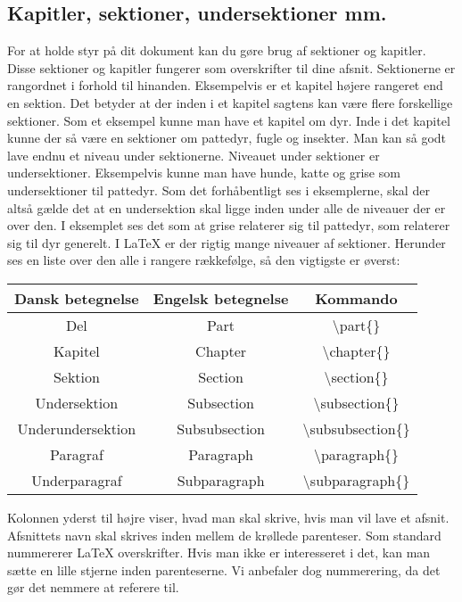\subsection{Kapitler, sektioner, undersektioner mm.}
For at holde styr på dit dokument kan du gøre brug af sektioner og kapitler.
Disse sektioner og kapitler fungerer som overskrifter til dine afsnit.
Sektionerne er rangordnet i forhold til hinanden.
Eksempelvis er et kapitel højere rangeret end en sektion.
Det betyder at der inden i et kapitel sagtens kan være flere forskellige sektioner.
Som et eksempel kunne man have et kapitel om dyr.
Inde i det kapitel kunne der så være en sektioner om pattedyr, fugle og insekter.
Man kan så godt lave endnu et niveau under sektionerne.
Niveauet under sektioner er undersektioner.
Eksempelvis kunne man have hunde, katte og grise som undersektioner til pattedyr.
Som det forhåbentligt ses i eksemplerne, skal der altså gælde det at en undersektion skal ligge inden under alle de niveauer der er over den.
I eksemplet ses det som at grise relaterer sig til pattedyr, som relaterer sig til dyr generelt.
I \LaTeX{} er der rigtig mange niveauer af sektioner.
Herunder ses en liste over den alle i rangere rækkefølge, så den vigtigste er øverst:
\bigbreak


\begin{center}
\begin{tabular}{|c|c|c|}
	\hline \textbf{Dansk betegnelse} & \textbf{Engelsk betegnelse} & \textbf{Kommando}\\ \hline
	Del & Part & \textbackslash part\{\} \\ \hline
	Kapitel & Chapter & \textbackslash chapter\{\} \\ \hline
	Sektion & Section & \textbackslash section\{\} \\ \hline
	Undersektion & Subsection & \textbackslash subsection\{\} \\ \hline
	Underundersektion & Subsubsection & \textbackslash subsubsection\{\} \\ \hline
	Paragraf & Paragraph & \textbackslash paragraph\{\} \\ \hline
	Underparagraf & Subparagraph & \textbackslash subparagraph\{\} \\ \hline
\end{tabular}
\end{center}

Kolonnen yderst til højre viser, hvad man skal skrive, hvis man vil lave et afsnit.
Afsnittets navn skal skrives inden mellem de krøllede parenteser.
Som standard nummererer \LaTeX{} overskrifter.
Hvis man ikke er interesseret i det, kan man sætte en lille stjerne inden parenteserne.
Vi anbefaler dog nummerering, da det gør det nemmere at referere til.

